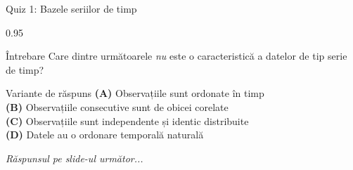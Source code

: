 \documentclass[9pt, aspectratio=169, t]{beamer}
\begin{document}
\begin{frame}{Quiz 1: Bazele seriilor de timp}
    \begin{cminipage}{0.95\textwidth}
    \begin{alertblock}{Întrebare}
        Care dintre următoarele \emph{nu} este o caracteristică a datelor de tip serie de timp?
    \end{alertblock}

    \vspace{0.4cm}

    \begin{block}{Variante de răspuns}
        \textcolor{MainBlue}{\textbf{(A)}} Observațiile sunt ordonate în timp\\[3pt]
        \textcolor{MainBlue}{\textbf{(B)}} Observațiile consecutive sunt de obicei corelate\\[3pt]
        \textcolor{MainBlue}{\textbf{(C)}} Observațiile sunt independente și identic distribuite\\[3pt]
        \textcolor{MainBlue}{\textbf{(D)}} Datele au o ordonare temporală naturală
    \end{block}

    \vspace{0.5cm}

    \begin{center}
        \textit{Răspunsul pe slide-ul următor...}
    \end{center}
    \end{cminipage}
\end{frame}
\end{document}

